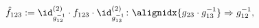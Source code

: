 \begin{equation}
  {\hat f}_{123}:=\id^{(2)}_{g_{12}^{-1}}\cdot f_{123}\cdot
  \id^{(2)}_{g_{13}^{-1}}\colon \alignidx{g_{23}\cdot g_{13}^{-1}}\Rightarrow
  g_{12}^{-1},
\end{equation}

